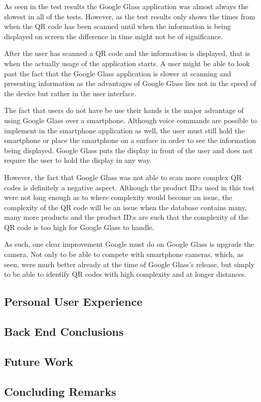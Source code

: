 As seen in the test results the Google Glass application was almost always the slowest in all of the tests. However, as the test results only shows the times from when the QR code has been scanned until when the information is being displayed on screen the difference in time might not be of significance. 

After the user has scanned a QR code and the information is displayed, that is when the actually usage of the application starts. A user might be able to look past the fact that the Google Glass application is slower at scanning and presenting information as the advantages of Google Glass lies not in the speed of the device but rather in the user interface.

The fact that users do not have be use their hands is the major advantage of using Google Glass over a smartphone. Although voice commands are possible to implement in the smartphone application as well, the user must still hold the smartphone or place the smartphone on a surface in order to see the information being displayed. Google Glass puts the display in front of the user and does not require the user to hold the display in any way.

However, the fact that Google Glass was not able to scan more complex QR codes is definitely a negative aspect. Although the product ID:s used in this test were not long enough as to where complexity would become an issue, the complexity of the QR code will be an issue when the database contains many, many more products and the product ID:s are such that the complexity of the QR code is too high for Google Glass to handle.

As such, one clear improvement Google must do on Google Glass is upgrade the camera. Not only to be able to compete with smartphone cameras, which, as seen, were much better already at the time of Google Glass's release, but simply to be able to identify QR codes with high complexity and at longer distances.

\subsection{Personal User Experience}
\label{subsec:personalexperience}


\subsection{Back End Conclusions}

\subsection{Future Work}
\label{subsec:futurework}


\subsection{Concluding Remarks}
